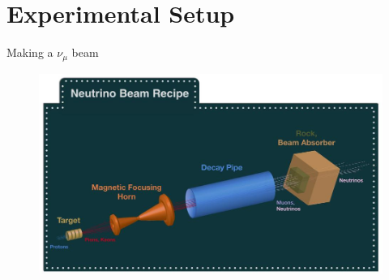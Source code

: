 \documentclass{beamer}
\begin{document}
\section{Experimental Setup}
\begin{frame}{Making a $\nu_{\mu}$ beam}
    \begin{figure}
        \centering
        \includegraphics[width = \linewidth]{umn/fermilab-neutrino-beam.jpg}
        \label{fig:neutrino-beam}
    \end{figure}
    \vspace{-1 cm}
    \centering
    \footnotesize
    \cite{neutrino-beam}
    \normalsize
\end{frame}
\end{document}
